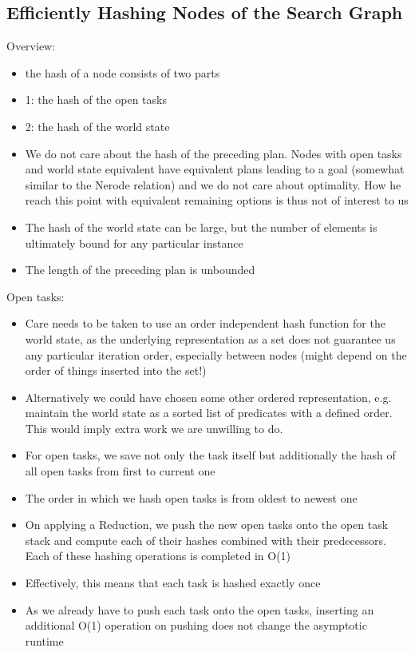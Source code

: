 \subsection{Efficiently Hashing Nodes of the Search Graph}
Overview:
\begin{itemize}
	\item the hash of a node consists of two parts
	\item 1: the hash of the open tasks
	\item 2: the hash of the world state
	\item We do not care about the hash of the preceding plan. Nodes with open tasks and world state equivalent have equivalent plans leading to a goal (somewhat similar to the Nerode relation) and we do not care about optimality. How he reach this point with equivalent remaining options is thus not of interest to us
	\item The hash of the world state can be large, but the number of elements is ultimately bound for any particular instance
	\item The length of the preceding plan is unbounded
\end{itemize}
Open tasks:
\begin{itemize}
	\item Care needs to be taken to use an order independent hash function for the world state, as the underlying representation as a set does not guarantee us any particular iteration order, especially between nodes (might depend on the order of things inserted into the set!)
	\item Alternatively we could have chosen some other ordered representation, e.g. maintain the world state as a sorted list of predicates with a defined order. This would imply extra work we are unwilling to do.
	\item For open tasks, we save not only the task itself but additionally the hash of all open tasks from first to current one
	\item The order in which we hash open tasks is from oldest to newest one
	\item On applying a Reduction, we push the new open tasks onto the open task stack and compute each of their hashes combined with their predecessors. Each of these hashing operations is completed in O(1)
	\item Effectively, this means that each task is hashed exactly once
	\item As we already have to push each task onto the open tasks, inserting an additional O(1) operation on pushing does not change the asymptotic runtime
\end{itemize}
